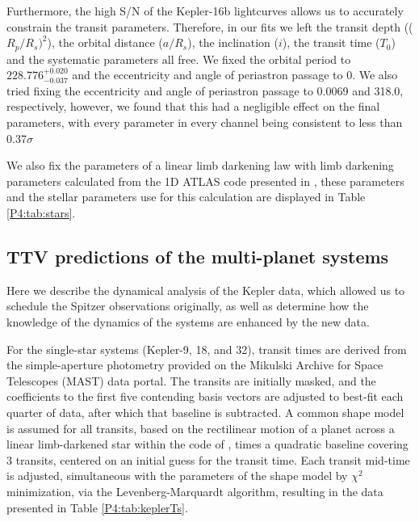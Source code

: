 Furthermore, the high S/N of the Kepler-16b lightcurves allows us to accurately constrain the transit parameters. Therefore, in our fits we left the transit depth (($R_p/R_s)^2$), the orbital distance ($a/R_s$), the inclination ($i$), the transit time ($T_0$) and the systematic parameters all free. We fixed the orbital period to $228.776_{-0.037}^{+0.020}$ \citep{Doyle2011} and the eccentricity and angle of periastron passage to 0. We also tried fixing the eccentricity and angle of periastron passage to 0.0069 and 318.0, respectively, however, we found that this had a negligible effect on the final parameters, with every parameter in every channel being consistent to less than 0.37$\sigma$

We also fix the parameters of a linear limb darkening law with limb darkening parameters calculated from the 1D ATLAS code presented in \citep{Sing2010}, these parameters and the stellar parameters use for this calculation are displayed in Table \ref{P4:tab:stars}.

\subsection{TTV predictions of the multi-planet systems}
\label{P4:sec:TTVpred}

Here we describe the dynamical analysis of the Kepler data, which allowed us to schedule the Spitzer observations originally, as well as determine how the knowledge of the dynamics of the systems are enhanced by the new data.

For the single-star systems (Kepler-9, 18, and 32), transit times are derived from the simple-aperture photometry provided on the Mikulski Archive for Space Telescopes (MAST) data portal. The transits are initially masked, and the coefficients to the first five contending basis vectors are adjusted to best-fit each quarter of data, after which that baseline is subtracted. A common shape model is assumed for all transits, based on the rectilinear motion of a planet across a linear limb-darkened star within the code of \cite{Mandel2002}, times a quadratic baseline covering 3 transits, centered on an initial guess for the transit time. Each transit mid-time is adjusted, simultaneous with the parameters of the shape model by $\chi^2$ minimization, via the Levenberg-Marquardt algorithm, resulting in the data presented in Table \ref{P4:tab:keplerTs}.

